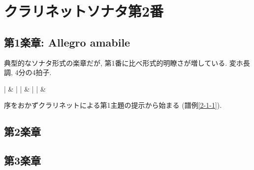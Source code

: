 
\chapter{クラリネットソナタ第2番}


\section{第1楽章: Allegro amabile}

典型的なソナタ形式の楽章だが, 第1番に比べ形式的明瞭さが増している. 変ホ長調, 4分の4拍子.

\musicbegin
	\def\nbinstruments{2}%
	\startextract%
		\notes{}\cu{**}|%
			\cu{**}&%
			\enotes
		\bar
		\notes|%
			&%
			\ds{}\enotes
		\bar
		\notes|%
			&%
			\ds{}\enotes
	\endextract %


序をおかずクラリネットによる第1主題の提示から始まる (譜例\ref{2-1-1}).


\section{第2楽章}

\section{第3楽章}
